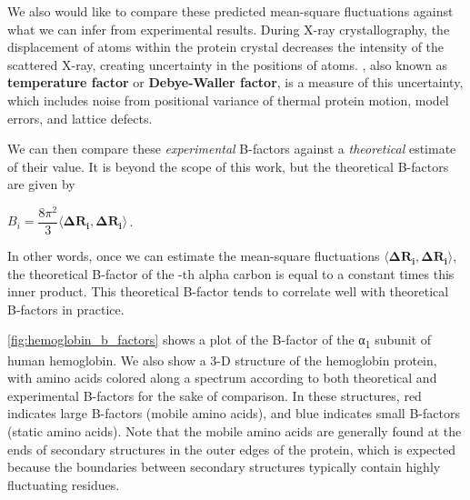 We also would like to compare these predicted mean-square fluctuations against what we can infer from experimental results. During X-ray crystallography, the displacement of atoms within the protein crystal decreases the intensity of the scattered X-ray, creating uncertainty in the positions of atoms. , also known as \textbf{temperature factor} or \textbf{Debye-Waller factor}, is a measure of this uncertainty, which includes noise from positional variance of thermal protein motion, model errors, and lattice defects.

We can then compare these \textit{experimental} B-factors against a \textit{theoretical} estimate of their value. It is beyond the scope of this work, but the theoretical B-factors are given by

\begin{center}
$ B_i = \dfrac{8 \pi^2}{3} \langle \mathbf{\Delta R_i}, \mathbf{\Delta R_i} \rangle$\,.
\end{center}

In other words, once we can estimate the mean-square fluctuations $\langle \mathbf{\Delta R_i}, \mathbf{\Delta R_i} \rangle$, the theoretical B-factor of the -th alpha carbon is equal to a constant times this inner product. This theoretical B-factor tends to correlate well with theoretical B-factors in practice.

\autoref{fig:hemoglobin_b_factors} shows a plot of the B-factor of the α\textsubscript{1} subunit of human hemoglobin. We also show a 3-D structure of the hemoglobin protein, with amino acids colored along a spectrum according to both theoretical and experimental B-factors for the sake of comparison. In these structures, red indicates large B-factors (mobile amino acids), and blue indicates small B-factors (static amino acids). Note that the mobile amino acids are generally found at the ends of secondary structures in the outer edges of the protein, which is expected because the boundaries between secondary structures typically contain highly fluctuating residues.\\


